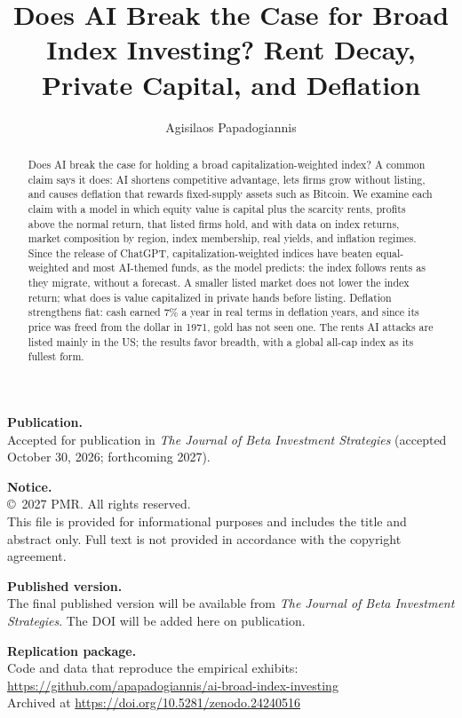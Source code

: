\documentclass[12pt]{article}
\title{Does AI Break the Case for Broad Index Investing? Rent Decay, Private Capital, and Deflation}
\author{Agisilaos Papadogiannis}
\date{}
\begin{document}
\maketitle
\begin{abstract}
Does AI break the case for holding a broad capitalization-weighted index? A common claim says it does: AI shortens competitive advantage, lets firms grow without listing, and causes deflation that rewards fixed-supply assets such as Bitcoin. We examine each claim with a model in which equity value is capital plus the scarcity rents, profits above the normal return, that listed firms hold, and with data on index returns, market composition by region, index membership, real yields, and inflation regimes. Since the release of ChatGPT, capitalization-weighted indices have beaten equal-weighted and most AI-themed funds, as the model predicts: the index follows rents as they migrate, without a forecast. A smaller listed market does not lower the index return; what does is value capitalized in private hands before listing. Deflation strengthens fiat: cash earned 7\% a year in real terms in deflation years, and since its price was freed from the dollar in 1971, gold has not seen one. The rents AI attacks are listed mainly in the US; the results favor breadth, with a global all-cap index as its fullest form.
\end{abstract}

\vspace{1.5em}
\noindent\textbf{Publication.}\\
Accepted for publication in \textit{The Journal of Beta Investment Strategies} (accepted October 30, 2026; forthcoming 2027).

\noindent\textbf{Notice.}\\
\copyright\ 2027 PMR. All rights reserved.\\
This file is provided for informational purposes and includes the title and abstract only. Full text is not provided in accordance with the copyright agreement.

\noindent\textbf{Published version.}\\
The final published version will be available from \textit{The Journal of Beta Investment Strategies}. The DOI will be added here on publication.

\noindent\textbf{Replication package.}\\
Code and data that reproduce the empirical exhibits:\\
\url{https://github.com/apapadogiannis/ai-broad-index-investing}\\
Archived at \url{https://doi.org/10.5281/zenodo.24240516}
\end{document}
